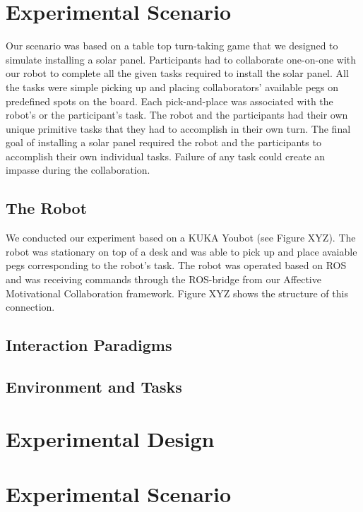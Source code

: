 \documentclass{sig-alternate-05-2015}
\begin{document}
\section{Experimental Scenario}

Our scenario was based on a table top turn-taking game that we designed to
simulate installing a solar panel. Participants had to collaborate one-on-one
with our robot to complete all the given tasks required to install the solar
panel. All the tasks were simple picking up and placing collaborators' available
pegs on predefined spots on the board. Each pick-and-place was associated with
the robot's or the participant's task. The robot and the participants had their
own unique primitive tasks that they had to accomplish in their own turn. The final
goal of installing a solar panel required the robot and the participants to
accomplish their own individual tasks. Failure of any task could create an
impasse during the collaboration.

\subsection{The Robot}

We conducted our experiment based on a KUKA Youbot (see Figure XYZ). The robot
was stationary on top of a desk and was able to pick up and place avaiable pegs
corresponding to the robot's task. The robot was operated based on ROS and
was receiving commands through the ROS-bridge from our Affective Motivational
Collaboration framework. Figure XYZ shows the structure of this connection.

\subsection{Interaction Paradigms}

\subsection{Environment and Tasks}



\section{Experimental Design}



\section{Experimental Scenario}
\end{document}
